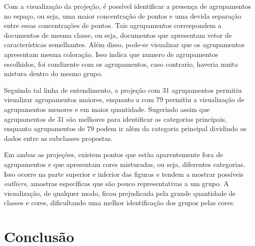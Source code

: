 \documentclass[conference]{IEEEtran}
\begin{document}
Com a visualização da projeção, é possível identificar a presença de agrupamentos no espaço, ou seja, uma maior concentração de pontos e uma devida separação entre essas concentrações de pontos. Tais agrupamentos correspondem a documentos de mesma classe, ou seja, documentos que apresentam vetor de características semelhantes. Além disso, pode-se visualizar que os agrupamentos apresentam mesma coloração. Isso indica que numero de agrupamentos escolhidos, foi condizente com os agrupamentos, caso contrario, haveria muita mistura dentro do mesmo grupo.

Seguindo tal linha de entendimento, a projeção com $31$ agrupamentos permitiu visualizar agrupamentos maiores, enquanto a com $79$ permitiu a visualização de agrupamentos menores e em maior quantidade. Sugerindo assim que agrupamentos de $31$ são melhores para identificar as categorias principais, enquanto agrupamentos de $79$ podem ir além da categoria principal dividindo os dados entre as subclasses propostas. 

Em ambas as projeções, existem pontos que estão aparentemente fora de agrupamentos e que apresentam cores misturadas, ou seja, diferentes categorias. Isso ocorre na parte superior e inferior das figuras e tendem a mostrar possíveis \emph{outliers}, amostras específicas que são pouco representativas a um grupo. A visualização, de qualquer modo, ficou prejudicada pela grande quantidade de classes e cores, dificultando uma melhor identificação dos grupos pelas cores.

\section{Conclusão}
\end{document}
